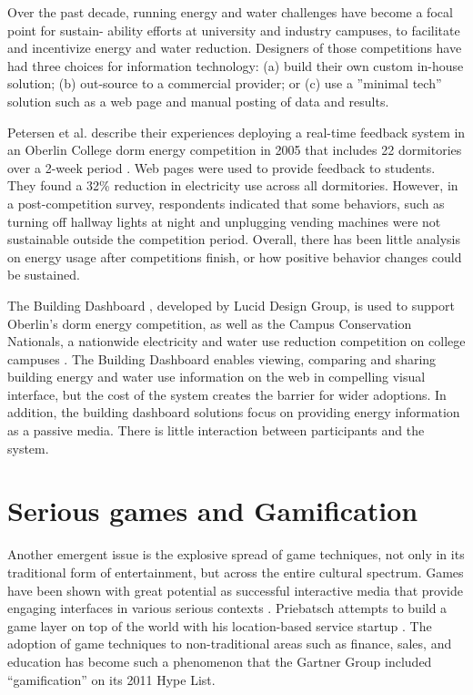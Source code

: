 Over the past decade, running energy and water challenges have become a focal point for sustain-
ability efforts at university and industry campuses, to facilitate and incentivize energy and water reduction. Designers of those competitions
have had three choices for information technology: (a) build their own custom in-house solution;
(b) out-source to a commercial provider; or (c) use a ”minimal tech” solution such as a web page
and manual posting of data and results.

Petersen et al. describe their experiences deploying a real-time feedback
system in an Oberlin College dorm energy competition in 2005 that includes 22
dormitories over a 2-week period \cite{petersen-dorm-energy-reduction}. Web
pages were used to provide feedback to students. They found a 32\% reduction in
electricity use across all dormitories. However, in a post-competition survey,
respondents indicated that some behaviors, such as turning off hallway lights
at night and unplugging vending machines were not sustainable outside the
competition period.  Overall, there has been little analysis on energy usage
after competitions finish, or how positive behavior changes could be sustained.

The Building Dashboard \cite{building-dashboard}, developed by Lucid Design
Group, is used to support Oberlin's dorm energy competition,
as well as the Campus Conservation Nationals, a nationwide electricity and
water use reduction competition on college campuses \cite{competetoreduce}.
The Building Dashboard enables viewing, comparing and sharing building energy
and water use information on the web in compelling visual interface, but the
cost of the system creates the barrier for wider adoptions. In addition, the
building dashboard solutions focus on providing energy information as
a passive media. There is little interaction between participants and the system.

\section{Serious games and Gamification}
Another emergent issue is the explosive spread of game techniques, not only in
its traditional form of entertainment, but across the entire cultural spectrum.
Games have been shown with great potential as successful
interactive media that provide engaging interfaces in various serious contexts
\cite{mcgonigal2011reality,reeves2009total}. Priebatsch attempts to build a
game layer on top of the world with his location-based service startup
\cite{Priebatsch2010ted}. The adoption of game techniques to non-traditional areas such as finance,
sales, and education has become such a phenomenon that the Gartner Group
included ``gamification'' \cite{Deterding2011mt} on its 2011 Hype List.

